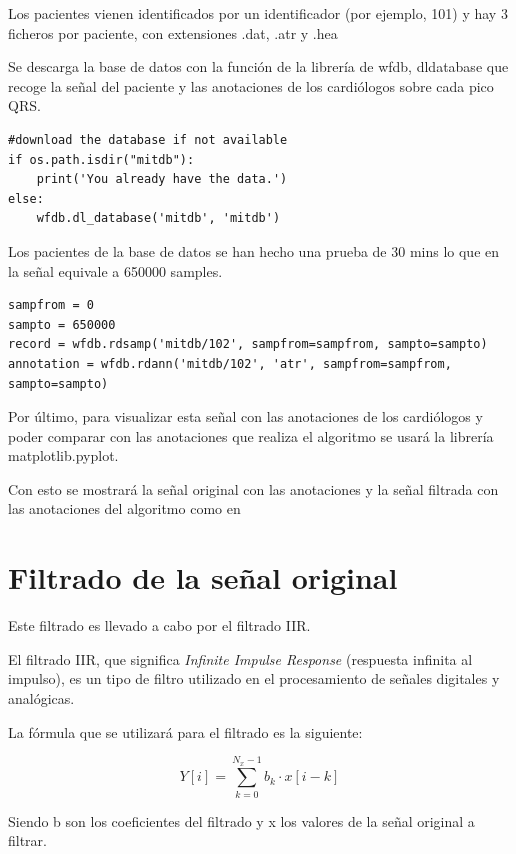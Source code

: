 Los pacientes vienen identificados por un identificador (por ejemplo, 101) y hay 3 ficheros por paciente, 
con extensiones .dat, .atr y .hea

Se descarga la base de datos con la función de la librería de wfdb, dldatabase que recoge 
la señal del paciente y las anotaciones de los cardiólogos sobre cada pico QRS.


\lstset{language=python, breaklines=true, basicstyle=\footnotesize}
\begin{lstlisting}[frame=single]
#download the database if not available
if os.path.isdir("mitdb"):
	print('You already have the data.')
else:
	wfdb.dl_database('mitdb', 'mitdb')
\end{lstlisting}

Los pacientes de la base de datos se han hecho una prueba de 30 mins lo que en la señal 
equivale a 650000 samples.

\lstset{language=python, breaklines=true, basicstyle=\footnotesize}
\begin{lstlisting}[frame=single]
sampfrom = 0
sampto = 650000
record = wfdb.rdsamp('mitdb/102', sampfrom=sampfrom, sampto=sampto)
annotation = wfdb.rdann('mitdb/102', 'atr', sampfrom=sampfrom, sampto=sampto)
\end{lstlisting}

Por último, para visualizar esta señal con las anotaciones de los cardiólogos y poder comparar 
con las anotaciones que realiza el algoritmo se usará la librería matplotlib.pyplot.

Con esto se mostrará la señal original con las anotaciones y la señal filtrada con las anotaciones
del algoritmo como en 

\section{Filtrado de la señal original}
Este filtrado es llevado a cabo por el filtrado IIR.

El filtrado IIR, que significa \textit{Infinite Impulse Response} (respuesta infinita al impulso),
es un tipo de filtro utilizado en el procesamiento de señales digitales y analógicas.

La fórmula que se utilizará para el filtrado es la siguiente:

\[ Y[i] = \sum_{k=0}^{N_x -1} b_k \cdot x[i-k] \]

Siendo b son los coeficientes del filtrado y x los valores de la señal original a filtrar.


